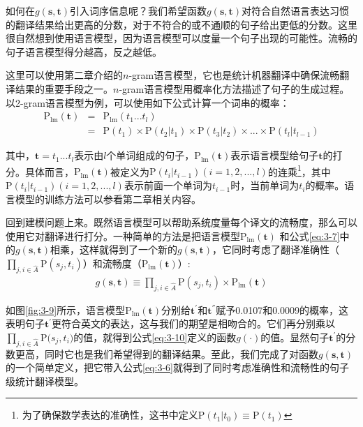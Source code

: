 \parinterval 如何在$g(\mathbf{s},\mathbf{t})$引入词序信息呢？我们希望函数$g(\mathbf{s},\mathbf{t})$对符合自然语言表达习惯的翻译结果给出更高的分数，对于不符合的或不通顺的句子给出更低的分数。这里很自然想到使用语言模型，因为语言模型可以度量一个句子出现的可能性。流畅的句子语言模型得分越高，反之越低。

\parinterval 这里可以使用第二章介绍的$n$-gram语言模型，它也是统计机器翻译中确保流畅翻译结果的重要手段之一。$n$-gram语言模型用概率化方法描述了句子的生成过程。以2-gram语言模型为例，可以使用如下公式计算一个词串的概率：
\begin{eqnarray}
\textrm{P}_{\textrm{lm}}(\mathbf{t}) & = & \textrm{P}_{\textrm{lm}}(t_1...t_l) \nonumber \\
                                           & =  & \textrm{P}(t_1)\times \textrm{P}(t_2|t_1)\times \textrm{P}(t_3|t_2)\times ... \times \textrm{P}(t_l|t_{l-1})
\label{eq:3-9}
\end{eqnarray}

\noindent  其中，$\mathbf{t}=t_1...t_l$表示由$l$个单词组成的句子，$\textrm{P}_{\textrm{lm}}(\mathbf{t})$表示语言模型给句子$\mathbf{t}$的打分。具体而言，$\textrm{P}_{\textrm{lm}}(\mathbf{t})$被定义为$\textrm{P}(t_i|t_{i-1})(i=1,2,...,l)$的连乘\footnote{为了确保数学表达的准确性，这书中定义$\textrm{P}(t_1|t_0) \equiv \textrm{P}(t_1)$}，其中$\textrm{P}(t_i|t_{i-1})(i=1,2,...,l)$表示前面一个单词为$t_{i-1}$时，当前单词为$t_i$的概率。语言模型的训练方法可以参看第二章相关内容。

\parinterval 回到建模问题上来。既然语言模型可以帮助系统度量每个译文的流畅度，那么可以使用它对翻译进行打分。一种简单的方法是把语言模型$\textrm{P}_{\textrm{lm}}{(\mathbf{t})}$ 和公式\ref{eq:3-7}中的$g(\mathbf{s},\mathbf{t})$相乘，这样就得到了一个新的$g(\mathbf{s},\mathbf{t})$，它同时考虑了翻译准确性（$\prod_{j,i \in \widehat{A}}{\textrm{P}(s_j,t_i)}$）和流畅度（$\textrm{P}_{\textrm{lm}}(\mathbf{t})$）:
\begin{eqnarray}
g(\mathbf{s},\mathbf{t}) \equiv \prod_{j,i \in \widehat{A}}{\textrm{P}(s_j,t_i)} \times  \textrm{P}_{\textrm{lm}}(\mathbf{t})
\label{eq:3-10}
\end{eqnarray}

\parinterval 如图\ref{fig:3-9}所示，语言模型$\textrm{P}_{\textrm{lm}}(\mathbf{t})$分别给$\mathbf{t}^{'}$和$\mathbf{t}^{''}$赋予0.0107和0.0009的概率，这表明句子$\mathbf{t}^{'}$更符合英文的表达，这与我们的期望是相吻合的。它们再分别乘以$\prod_{j,i \in \widehat{A}}{\textrm{P}(s_j},t_i)$的值，就得到公式\ref{eq:3-10}定义的函数$g(\cdot)$的值。显然句子$\mathbf{t}^{'}$的分数更高，同时它也是我们希望得到的翻译结果。至此，我们完成了对函数$g(\mathbf{s},\mathbf{t})$的一个简单定义，把它带入公式\ref{eq:3-6}就得到了同时考虑准确性和流畅性的句子级统计翻译模型。

